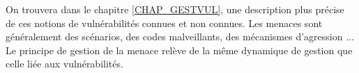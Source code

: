 On trouvera dans le chapitre \ref{CHAP_GESTVUL}, une description plus précise de ces notions de vulnérabilités connues et non connues. Les menaces sont généralement des scénarios, des codes malveillants, des mécanismes d'agression ...
Le principe de gestion de la menace relève de la même dynamique de gestion que celle liée aux vulnérabilités. 


